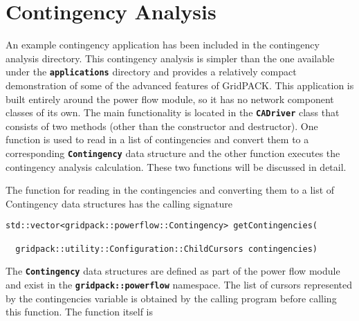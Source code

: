 \section{Contingency Analysis}

An example contingency application has been included in the contingency analysis directory. This contingency analysis is simpler than the one available under the \texttt{\textbf{applications}} directory and provides a relatively compact demonstration of some of the advanced features of GridPACK. This application is built entirely around the power flow module, so it has no network component classes of its own. The main functionality is located in the \texttt{\textbf{CADriver}} class that consists of two methods (other than the constructor and destructor). One function is used to read in a list of contingencies and convert them to a corresponding \texttt{\textbf{Contingency}} data structure and the other function executes the contingency analysis calculation. These two functions will be discussed in detail.

The function for reading in the contingencies and converting them to a list of
Contingency data structures has the calling signature

{
\color{red}
\begin{Verbatim}[fontseries=b]
std::vector<gridpack::powerflow::Contingency> getContingencies(

  gridpack::utility::Configuration::ChildCursors contingencies)
\end{Verbatim}
}

The \texttt{\textbf{Contingency}} data structures are defined as part of the power flow module and exist in the \texttt{\textbf{gridpack::powerflow}} namespace. The list of cursors represented by the contingencies variable is obtained by the calling program before calling this function. The function itself is

